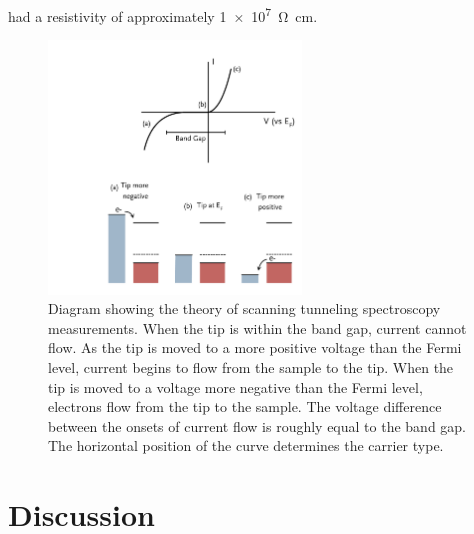 had a resistivity of approximately \SI{1e7}{\ohm\centi\meter}.
\begin{figure}
	\centerline{\includegraphics[width=0.6\textwidth]{stsdiagram.pdf}}
		\caption[Theory of scanning tunneling spectroscopy measurements]{%
			Diagram showing the theory of scanning tunneling spectroscopy 
			measurements. When the tip is within the band gap, current cannot
			 flow. As the tip is moved to a more positive voltage than the 
			 Fermi level, current begins to flow from the sample to the tip. 
			 When the tip is moved to a voltage more negative than the Fermi 
			 level, electrons flow from the tip to the sample. The voltage 
			 difference between the onsets of current flow is roughly equal 
			 to the band gap. The horizontal position of the curve determines 
			 the carrier type.}
	\label{fig:stsdiagram}
\end{figure}

\section{Discussion}\label{sec:ch7discussion}

